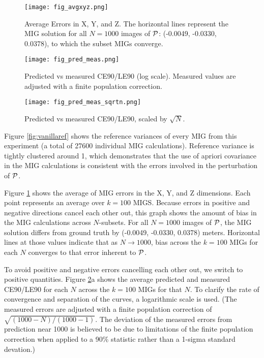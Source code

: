 \documentclass[10pt]{amsart}
\begin{document}
\begin{figure}
\texttt{[image: fig\_avgxyz.png]}
\caption{\label{fig:vanillaxyz}Average Errors in X, Y, and Z. The horizontal
  lines represent the MIG solution for all $N=1000$ images of $\mathcal{P}$: (-0.0049,
  -0.0330, 0.0378), to which the subset MIGs converge.}
\end{figure}

\begin{figure}
\texttt{[image: fig\_pred\_meas.png]}
\caption{\label{fig:vanilla_pred_meas}Predicted vs measured CE90/LE90 (log
  scale). Measured values are adjusted with a finite population correction.}
\end{figure}

\begin{figure}
\texttt{[image: fig\_pred\_meas\_sqrtn.png]}
\caption{\label{fig:vanilla_pred_meas_sqrtn}Predicted vs measured CE90/LE90,
  scaled by $\sqrt{N}$.}
\end{figure}

Figure \ref{fig:vanillaref} shows the reference variances of every MIG from this
experiment (a total of 27600 individual MIG calculations). Reference variance is
tightly clustered around 1, which demonstrates that the use of apriori
covariance in the MIG calculations is consistent with the errors involved in the
perturbation of $\mathcal{P}$.

Figure \ref{fig:vanillaxyz} shows the average of MIG errors in the X, Y, and Z
dimensions. Each point represents an average over $k=100$ MIGS. Because errors
in positive and negative directions cancel each other out, this graph shows the
amount of bias in the MIG calculations across $N$-subsets. For all $N=1000$
images of $\mathcal{P}$, the MIG solution differs from ground truth by (-0.0049,
-0.0330, 0.0378) meters. Horizontal lines at those values indicate that as
$N\rightarrow 1000$, bias across the $k=100$ MIGs for each $N$ converges to that
error inherent to $\mathcal{P}$.

To avoid positive and negative errors cancelling each other out, we switch to
positive quantities. Figure \ref{fig:vanilla_pred_meas}a shows the average
predicted and measured CE90/LE90 for each $N$ across the $k=100$ MIGs for that
$N$. To clarify the rate of convergence and separation of the curves, a
logarithmic scale is used. (The measured errors are adjusted with a finite
population correction of $\sqrt{(1000-N)/(1000-1)}$. The deviation of the
measured errors from prediction near 1000 is believed to be due to limitations
of the finite population correction when applied to a 90\% statistic rather than
a 1-sigma standard devation.)
\end{document}
